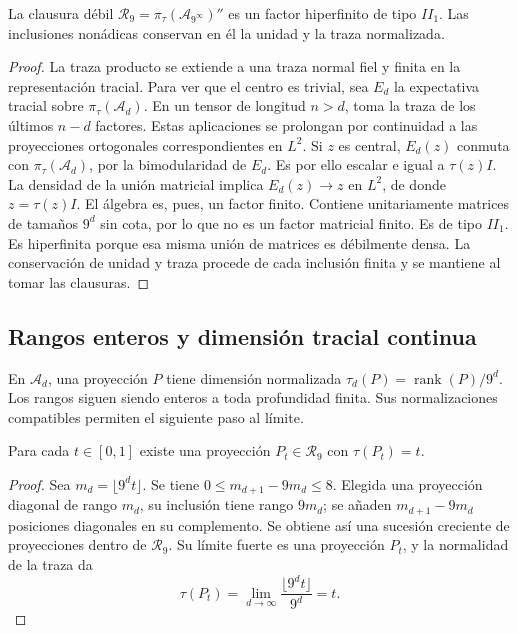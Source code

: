 \begin{theorem}
\label{iv:iv:thm:factor-tracial}
La clausura débil
\(\mathcal R_9=\pi_\tau(\mathcal A_{9^\infty})''\)
es un factor hiperfinito de tipo \(II_1\). Las inclusiones
nonádicas conservan en él la unidad y la traza normalizada.
\end{theorem}
\begin{proof}
La traza producto se extiende a una traza normal fiel y finita
en la representación tracial. Para ver que el centro es trivial,
sea \(E_d\) la expectativa tracial sobre \(\pi_\tau(\mathcal A_d)\).
En un tensor de longitud \(n>d\), toma la traza de los últimos
\(n-d\) factores. Estas aplicaciones se prolongan por continuidad
a las proyecciones ortogonales correspondientes en \(L^2\).
Si \(z\) es central, \(E_d(z)\) conmuta con
\(\pi_\tau(\mathcal A_d)\), por la bimodularidad de \(E_d\).
Es por ello escalar e igual a \(\tau(z)I\). La densidad de la
unión matricial implica \(E_d(z)\to z\) en \(L^2\), de donde
\(z=\tau(z)I\). El álgebra es, pues, un factor finito.
Contiene unitariamente matrices de tamaños \(9^d\) sin cota,
por lo que no es un factor matricial finito. Es de tipo \(II_1\).
Es hiperfinita porque esa misma unión de matrices es débilmente
densa. La conservación de unidad y traza procede de cada inclusión
finita y se mantiene al tomar las clausuras.
\end{proof}

\subsection{Rangos enteros y dimensión tracial continua}

En \(\mathcal A_d\), una proyección \(P\) tiene dimensión
normalizada \(\tau_d(P)=\operatorname{rank}(P)/9^d\).
Los rangos siguen siendo enteros a toda profundidad finita. Sus
normalizaciones compatibles permiten el siguiente paso al límite.

\begin{proposition}
\label{iv:iv:prop:dimension-tracial}
Para cada \(t\in[0,1]\) existe una proyección
\(P_t\in\mathcal R_9\) con \(\tau(P_t)=t\).
\end{proposition}
\begin{proof}
Sea \(m_d=\lfloor9^dt\rfloor\). Se tiene
\(0\leq m_{d+1}-9m_d\leq8\). Elegida una proyección diagonal
de rango \(m_d\), su inclusión tiene rango \(9m_d\); se
añaden \(m_{d+1}-9m_d\) posiciones diagonales en su complemento.
Se obtiene así una sucesión creciente de proyecciones dentro de
\(\mathcal R_9\). Su límite fuerte es una proyección \(P_t\),
y la normalidad de la traza da
\[
 \tau(P_t)=\lim_{d\to\infty}\frac{\lfloor9^dt\rfloor}{9^d}=t.
\]
\end{proof}

